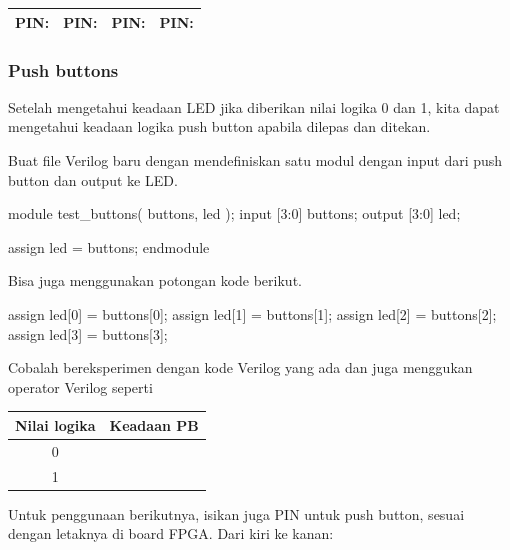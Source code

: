 \begin{table}[H]
{\centering
\begin{tabular}{|c|c|c|c|}
\hline
PIN: \hspace{2cm} & PIN: \hspace{2cm} & PIN: \hspace{2cm} & PIN: \hspace{2cm} \\
\hline
\end{tabular}
\par}
\end{table}

\subsubsection{Push buttons}

Setelah mengetahui keadaan LED jika diberikan nilai logika 0 dan 1, kita
dapat mengetahui keadaan logika push button apabila dilepas dan ditekan.

Buat file Verilog baru dengan mendefiniskan satu modul
dengan input dari push button dan output ke LED.

\begin{verilogcode}
module test_buttons( buttons, led );
  input  [3:0] buttons;
  output [3:0] led;

  assign led = buttons;
endmodule
\end{verilogcode}

Bisa juga menggunakan potongan kode berikut.
\begin{verilogcode}
  assign led[0] = buttons[0];
  assign led[1] = buttons[1];
  assign led[2] = buttons[2];
  assign led[3] = buttons[3];
\end{verilogcode}

Cobalah bereksperimen dengan kode Verilog yang ada dan juga menggukan operator Verilog
seperti 

\begin{table}[H]
\centering
\begin{tabular}{|c|c|}
\hline
Nilai logika & Keadaan PB \\
\hline
0 & \\
1 & \\
\hline
\end{tabular}
\par
\end{table}

Untuk penggunaan berikutnya, isikan juga PIN untuk push button,
sesuai dengan letaknya di board FPGA. Dari kiri ke kanan:

